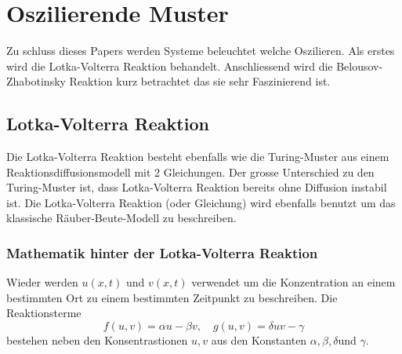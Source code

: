 %
%
%
%
\section{Oszilierende Muster
\label{reaktdiff:section:teil2}}
Zu schluss dieses Papers werden Systeme beleuchtet welche Oszilieren. Als erstes wird die Lotka-Volterra Reaktion behandelt.
Anschliessend wird die Belousov-Zhabotinsky Reaktion kurz betrachtet das sie sehr Faszinierend ist.

\subsection{Lotka-Volterra Reaktion 
\label{reaktdiff:subsection:bonorum}}

Die Lotka-Volterra Reaktion besteht ebenfalls wie die Turing-Muster aus einem Reaktionsdiffusionsmodell mit 2 Gleichungen.
Der grosse Unterschied zu den Turing-Muster ist, dass Lotka-Volterra Reaktion bereits ohne Diffusion instabil ist.
Die Lotka-Volterra Reaktion (oder Gleichung) wird ebenfalls benutzt um das klassische Räuber-Beute-Modell zu beschreiben.

\subsubsection{Mathematik hinter der Lotka-Volterra Reaktion}

Wieder werden \(u(x,t)\) und \(v(x,t)\) verwendet um die Konzentration an einem bestimmten Ort zu einem bestimmten Zeitpunkt zu beschreiben.
Die Reaktionsterme
\begin{equation}
     f(u,v) = \alpha u -  \beta v, \quad g(u,v)= \delta uv - \gamma
\end{equation}
bestehen neben den Konsentrastionen \(u,v\) aus den Konstanten \(\alpha,\beta,\delta \)und \(\gamma\).

